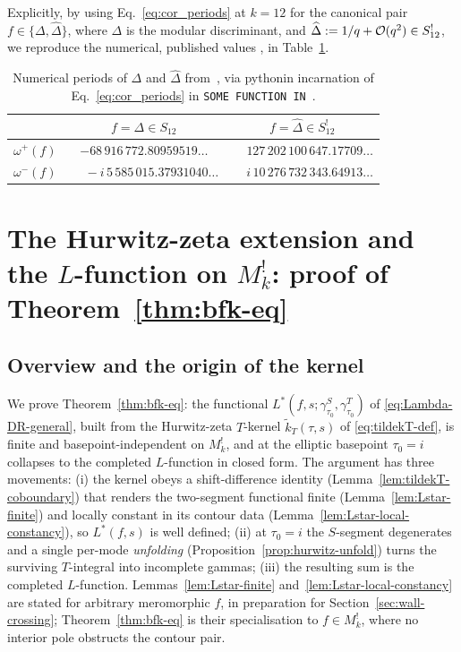 \documentclass[11pt]{article}
\numberwithin{equation}{section}  %
\newcommand{\Dhat}{\widehat{\Delta}}
\begin{document}
Explicitly, by using Eq.~\eqref{eq:cor_periods} at $k = 12$ 
for the canonical pair $f \in \{\Delta, \Dhat\}$, where $\Delta$ is the modular 
discriminant, and $\Dhat := 1/q + {\cal O}(q^2) \in S_{12}^!$, we reproduce 
the numerical, published values \cite{Brown2017}, in Table~\ref{tab:k12-periods}.

\begin{table}[h]
\centering
\begin{tabular}{c|cc}
& $f = \Delta \in S_{12}$
& $f = \Dhat \in S_{12}^!$ \\
\hline
$\omega^+(f)$    & $-68\,916\,772.80959519\ldots$  & $\phantom{-}127\,202\,100\,647.17709\ldots$ \\
$\omega^-(f)$  & $\phantom{-}-i\,5\,585\,015.37931040\ldots$   & $\phantom{-}i\,10\,276\,732\,343.64913\ldots$ \\
\end{tabular}
\caption{Numerical periods of $\Delta$ and $\Dhat$ from~\cite{Brown2017},
via pythonin incarnation of Eq.~\eqref{eq:cor_periods} in \texttt{SOME FUNCTION IN}~\cite{VerifyScripts}.}
\label{tab:k12-periods}
\end{table}


\section{The Hurwitz-zeta extension and the $L$-function on $M^!_k$: proof of Theorem~\ref{thm:bfk-eq}}\label{sec:hurwitz-extension}

\subsection{Overview and the origin of the kernel}\label{subsec:hurwitz-overview}

We prove Theorem~\ref{thm:bfk-eq}: the functional
$L^*(f, s; \gamma^S_{\tau_0}, \gamma^T_{\tau_0})$ of
\eqref{eq:Lambda-DR-general}, built from the Hurwitz-zeta $T$-kernel
$\widetilde{k}_T(\tau, s)$ of \eqref{eq:tildekT-def}, is finite and
basepoint-independent on $M^!_k$, and at the elliptic basepoint
$\tau_0 = i$ collapses to the completed $L$-function in closed form.
The argument has three movements: (i) the kernel obeys a
shift-difference identity (Lemma~\ref{lem:tildekT-coboundary}) that
renders the two-segment functional finite (Lemma~\ref{lem:Lstar-finite})
and locally constant in its contour data
(Lemma~\ref{lem:Lstar-local-constancy}), so $L^*(f, s)$ is well
defined; (ii) at $\tau_0 = i$ the $S$-segment degenerates and a single
per-mode \emph{unfolding} (Proposition~\ref{prop:hurwitz-unfold}) turns
the surviving $T$-integral into incomplete gammas; (iii) the resulting
sum is the completed $L$-function.  Lemmas~\ref{lem:Lstar-finite}
and~\ref{lem:Lstar-local-constancy} are stated for arbitrary
meromorphic $f$, in preparation for Section~\ref{sec:wall-crossing};
Theorem~\ref{thm:bfk-eq} is their specialisation to $f \in M^!_k$,
where no interior pole obstructs the contour pair.
\end{document}

